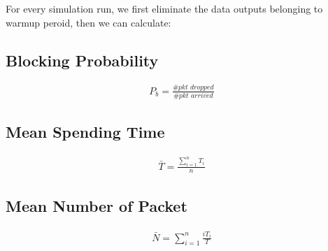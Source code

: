 \documentclass[12pt]{article}  %
\theoremstyle{definition}
\theoremstyle{remark}
\begin{document}
For every simulation run, we first eliminate the data outputs belonging to warmup peroid, then we can calculate:

\subsection{Blocking Probability}
\begin{align}
        \label{equ:blockprob}
        P_b = \frac{\textit{\#pkt dropped}}{\textit{\#pkt arrived}}
\end{align}

\subsection{Mean Spending Time}
\begin{align}
        \label{equ:meanspendingtime}
        \bar{T} = \frac{\sum_{i=1}^{n}T_i}{n}
\end{align}

\subsection{Mean Number of Packet}
\begin{align}
        \label{equ:meannumpkt}
        \bar{N} = \sum_{i=1}^{n}\frac{iT_i}{T}
\end{align}




\end{document}
